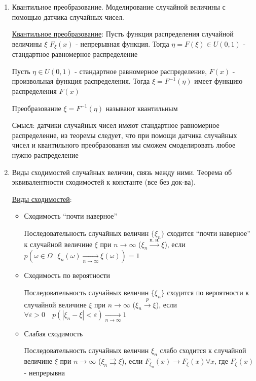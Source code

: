 \begin{enumerate}
    \item Квантильное преобразование. Моделирование случайной величины с помощью датчика случайных чисел.

    \hyperlink{quantiletransformation}{Квантильное преобразование}: Пусть функция распределения случайной величины $\xi$ $F_\xi(x)$ - непрерывная функция. 
    Тогда $\eta = F(\xi) \in U(0, 1)$ - стандартное равномерное распределение

    Пусть $\eta \in U(0, 1)$ - стандартное равномерное распределение, $F(x)$ - произвольная функция распределения. 
    Тогда $\xi = F^{-1}(\eta)$ имеет функцию распределения $F(x)$

    Преобразование $\xi = F^{-1}(\eta)$ называют квантильным

    Смысл: датчики случайных чисел имеют стандартное равномерное распределение, из теоремы следует, что при помощи
    датчика случайных чисел и квантильного преобразования мы сможем смоделировать любое нужно распределение


    \item Виды сходимостей случайных величин, связь между ними. Теорема об эквивалентности сходимостей к константе (все без док-ва).

    \hyperlink{convergencetypes}{Виды сходимостей}:

    \begin{itemize}
        \item Сходимость \enquote{почти наверное}

        \Defs Последовательность случайных величин $\{\xi_n\}$ сходится \enquote{почти наверное} к случайной величине $\xi$ при $n \to \infty$ ($\xi_n \overset{\text{п. н.}}{\longrightarrow} \xi$), 
        если $p(\omega \in \Omega \ | \ \xi_n(\omega) \underset{n \to \infty}{\longrightarrow} \xi(\omega)) = 1$

        \item Сходимость по вероятности

        \Defs Последовательность случайных величин $\{\xi_n\}$ сходится по вероятности к случайной величине $\xi$ при $n \to \infty$
        ($\xi_n \overset{p}{\longrightarrow} \xi$), если $\forall \varepsilon > 0 \quad p(|\xi_n - \xi| < \varepsilon) \underset{n \to \infty}{\longrightarrow} 1$
        
        \item Слабая сходимость

        \Defs Последовательность случайных величин $\xi_n$ слабо сходится к случайной величине $\xi$ при $n \to \infty$
        ($\xi_n \rightrightarrows \xi$), если $F_{\xi_n}(x) \longrightarrow F_\xi(x) \forall x$, где $F_\xi(x)$ - непрерывна
    \end{itemize}


\end{enumerate}
